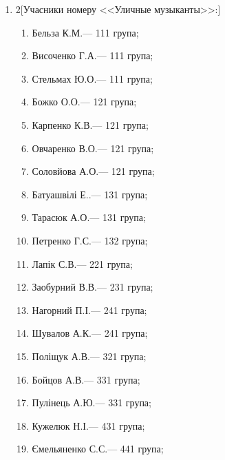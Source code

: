 \documentclass[
	a4paper,
	12pt,
	oneside,
	draft
]{extreport}
\begin{document}
\begin{enumerate}[topsep=0pt,itemsep=-1ex,partopsep=0ex,parsep=1ex]
\item 
\begin{multicols}{2}[Учасники номеру <<Уличные музыканты>>:] 
\begin{enumerate}[topsep=0pt,itemsep=-1ex,partopsep=0ex,parsep=1ex,label=\arabic*.]
\item Бельза К.М.\hfill --- 111 група;
\item Височенко Г.А.\hfill --- 111 група;
\item Стельмах Ю.О.\hfill --- 111 група;
\item Божко О.О.\hfill --- 121 група;
\item Карпенко К.В.\hfill --- 121 група;
\item Овчаренко В.О.\hfill --- 121 група;
\item Соловйова А.О.\hfill --- 121 група;
\item Батуашвілі Е..\hfill --- 131 група;
\item Тарасюк А.О.\hfill --- 131 група;
\item Петренко Г.С.\hfill --- 132 група;
\item Лапік С.В.\hfill --- 221 група;
\item Заобурний В.В.\hfill --- 231 група;
\item Нагорний П.І.\hfill --- 241 група;
\item Шувалов А.К.\hfill --- 241 група;
\item Поліщук А.В.\hfill --- 321 група;
\item Бойцов А.В.\hfill --- 331 група;
\item Пулінець А.Ю.\hfill --- 331 група;
\item Кужелюк Н.І.\hfill --- 431 група;
\item Ємельяненко С.С.\hfill --- 441 група;
\end{enumerate}
\end{multicols}


\end{enumerate}
\end{document}
